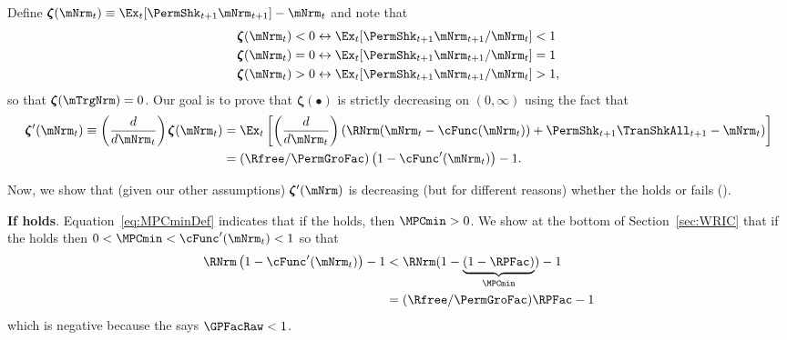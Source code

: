 \documentclass[\econtexRoot/BufferStockTheory]{subfiles}
\begin{document}
Define \providecommand{\difFunc}{\pmb{\zeta}} $\difFunc(\mNrm_t) \equiv 
\Ex_t[\PermShk_{t+1}\mNrm_{t+1}] - \mNrm_t$ and note that
\begin{equation}\begin{gathered}\begin{aligned}\label{eq:difLvlEquiv}
  \difFunc(\mNrm_t) < 0 &\leftrightarrow \Ex_t[\PermShk_{t+1}\mNrm_{t+1}/\mNrm_{t}] < 1 
                          \nonumber\\
  \difFunc(\mNrm_t) = 0 &\leftrightarrow \Ex_t[\PermShk_{t+1}\mNrm_{t+1}/\mNrm_{t}] = 1\\
  \difFunc(\mNrm_t) > 0 &\leftrightarrow \Ex_t[\PermShk_{t+1}\mNrm_{t+1}/\mNrm_{t}] > 
                          1,\nonumber
\end{aligned}\end{gathered}\end{equation}
so that $\difFunc(\mTrgNrm)=0$. Our goal is to prove that $\difFunc(\bullet)$ is strictly 
decreasing on $(0,\infty)$ using the fact that
\begin{equation}\begin{gathered}\begin{aligned}
  \difFunc^{\prime}(\mNrm_{t}) \equiv  \left( \frac{d}{d\mNrm_{t}}\right) \difFunc(\mNrm_t)  & = \Ex_{t}\left[
                                                                                               \left( \frac{d}{d\mNrm_{t}}\right) \left( 
                                                                                               {\RNrm}(\mNrm_{t}-\cFunc(\mNrm_{t}))+%
                                                                                               {\PermShk}_{t+1}{\TranShkAll}_{t+1} - {\mNrm}_t\right) \right] \label{eq:difFuncDecreases} \\
                                                                                             & = (\Rfree/\PermGroFac)\left(1-\cFunc^{\prime}({\mNrm}_t)\right) - 1.  \notag
\end{aligned}\end{gathered}\end{equation}

Now, we show that (given our other assumptions) $\difFunc^{\prime}(\mNrm)$ is decreasing (but for different reasons) whether the {\RIC} holds or fails (\cncl{\RIC}).

\textbf{If {\RIC} holds}. Equation~\eqref{eq:MPCminDef} indicates that if the {\RIC} holds, then $\MPCmin >0$.  We show at the bottom of Section~\ref{sec:WRIC} that if the {\RIC} holds then $0 < \MPCmin < \cFunc^{\prime}(\mNrm_{t}) < 1$ so that 
\begin{align*}
  \RNrm\left(1-\cFunc^{\prime}({\mNrm}_t)\right) - 1 & <  \RNrm(1-\underbrace{(1-\RPFac)}_{\MPCmin}) - 1  \\
                                                      & = (\Rfree/\PermGroFac)\RPFac - 1 
\end{align*}
which is negative because the {\GICRaw} says $\GPFacRaw < 1$.  
\end{document}
